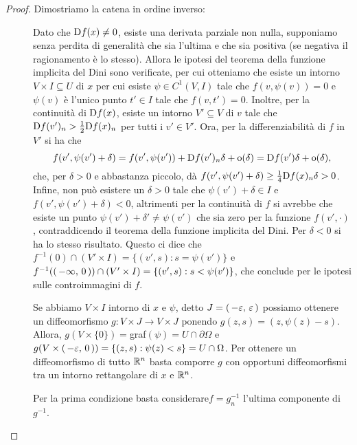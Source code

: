 \begin{proof}
	Dimostriamo la catena in ordine inverso:
	\begin{description}
		\item [] Dato che $\mathrm D f(x)\neq 0$, esiste una derivata parziale non nulla, supponiamo senza perdita di
			generalità che sia l'ultima e che sia positiva (se negativa il ragionamento è lo stesso).
			Allora le ipotesi del teorema della funzione implicita del Dini sono verificate, per cui otteniamo
			che esiste un intorno $V\times I\subseteq U$ di $x$ per cui esiste $\psi\in C^1(V,I)$ tale che $f(v,\psi(v))=0$ e $\psi(v)$
			è l'unico punto $t'\in I$ tale che $f(v,t')=0$.
			Inoltre, per la continuità di $\mathrm D f(x)$, esiste un intorno $V'\subseteq V$ di $v$ tale che $\mathrm D f(v')_n>\frac{1}{2}\mathrm D f(x)_n$ per tutti
			i $v'\in V'$. Ora, per la differenziabilità di $f$ in $V'$ si ha che
			\[
				f(v',\psi(v')+\delta)=f(v', \psi(v'))+\mathrm D f(v')_n\delta+\mathrm{o}(\delta)=\mathrm D f(v')\delta+\mathrm{o}(\delta),
			\]
			che, per $\delta>0$ e abbastanza piccolo, dà $f(v',\psi(v')+\delta)\geq \frac{1}{4}\mathrm D f(x)_n\delta>0$. Infine, non può esistere un $\delta>0$ tale che $\psi(v')+\delta\in I$ e
			$f(v',\psi(v')+\delta)<0$, altrimenti per la continuità di $f$ si avrebbe che esiste un punto $\psi(v')+\delta'\neq \psi(v')$
			che sia zero per la funzione $f(v',\cdot)$, contraddicendo il teorema della funzione implicita del Dini.
			Per $\delta<0$ si ha lo stesso risultato. Questo ci dice che $f^{-1}(0)\cap (V'\times I)=\{(v',s):s=\psi(v')\}$ e
			$f^{-1}(\left(\,-\infty,\,0\,\right))\cap (V'\times I)=\{(v',s):s<\psi(v')\}$, che conclude per le ipotesi sulle controimmagini di $f$.
		\item [] Se abbiamo $V\times I$ intorno di $x$ e $\psi$, detto $J=\left(\,-\varepsilon,\,\varepsilon\,\right)$
			possiamo ottenere un diffeomorfismo $g:V\times J \rightarrow V\times J$ ponendo $g(z,s)=(z,\psi(z)-s)$. Allora,
			$g(V\times \{0\})=$graf$(\psi)=U\cap \partial \Omega$ e $g(V\times \left(\,-\varepsilon,\,0\,\right))=\{(z,s):\psi(z)<s\}=U\cap \Omega$.
			Per ottenere un diffeomorfismo di tutto $\mathbb R^n$ basta comporre $g$ con opportuni diffeomorfismi tra un intorno rettangolare
			di $x$ e $\mathbb R^n$.
		\item [] Per la prima condizione basta considerare$f=g^{-1}_n$ l'ultima componente di $g^{-1}$.
	\end{description}
\end{proof}


